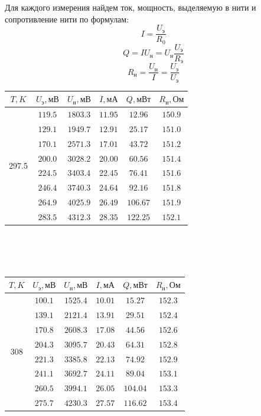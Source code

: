 \documentclass[20pt]{article}
\begin{document}
Для каждого измерения найдем ток, мощность, выделяемую в нити и сопротивление нити по формулам:
\[
	I = \frac{U_{\text{э}}}{R_0}
\]
\[
	Q = I U_{\text{н}} = U_{\text{н}} \frac{U_{\text{э}}}{R_{\text{э}}} 
\]
\[
	R_\text{н} = \frac{U_\text{н}}{I} = \frac{U_\text{э}}{U_\text{э}}
\]
\begin{tabular}{|c|c|c|c|c|c|}
\hline $T, K$ & $U_\text{э}, \text{мВ}$ & $U_{\text{н}}, \text{мВ}$ & $I, \text{мА}$ & $Q, \text{мВт}$ & $R_{\text{н}}, \text{Ом}$ \\\hline
\multirow{8}{*}{297.5}
 & $119.5$ & $1803.3$ & $11.95$ & $12.96$ & $150.9$ \\\cline{2-6}
 & $129.1$ & $1949.7$ & $12.91$ & $25.17$ & $151.0$ \\\cline{2-6}
 & $170.1$ & $2571.3$ & $17.01$ & $43.72$ & $151.2$ \\\cline{2-6}
 & $200.0$ & $3028.2$ & $20.00$ & $60.56$ & $151.4$ \\\cline{2-6}
 & $224.5$ & $3403.4$ & $22.45$ & $76.41$ & $151.6$ \\\cline{2-6}
 & $246.4$ & $3740.3$ & $24.64$ & $92.16$ & $151.8$ \\\cline{2-6}
 & $264.9$ & $4025.9$ & $26.49$ & $106.67$ & $151.9$ \\\cline{2-6}
 & $283.5$ & $4312.3$ & $28.35$ & $122.25$ & $152.1$ \\\hline
\end{tabular} \\\\\\
\begin{tabular}{|c|c|c|c|c|c|}
\hline $T, K$ & $U_\text{э}, \text{мВ}$ & $U_{\text{н}}, \text{мВ}$ & $I, \text{мА}$ & $Q, \text{мВт}$ & $R_{\text{н}}, \text{Ом}$ \\\hline
\multirow{8}{*}{308}
 & $100.1$ & $1525.4$ & $10.01$ & $15.27$ & $152.3$ \\\cline{2-6}
 & $139.1$ & $2121.4$ & $13.91$ & $29.51$ & $152.4$ \\\cline{2-6}
 & $170.8$ & $2608.3$ & $17.08$ & $44.56$ & $152.6$ \\\cline{2-6}
 & $204.3$ & $3095.7$ & $20.43$ & $64.31$ & $152.8$ \\\cline{2-6}
 & $221.3$ & $3385.8$ & $22.13$ & $74.92$ & $152.9$ \\\cline{2-6}
 & $241.1$ & $3692.7$ & $24.11$ & $89.04$ & $153.1$ \\\cline{2-6}
 & $260.5$ & $3994.1$ & $26.05$ & $104.04$ & $153.3$ \\\cline{2-6}
 & $275.7$ & $4230.3$ & $27.57$ & $116.62$ & $153.4$ \\\hline
\end{tabular} \\\\\\
\end{document}

